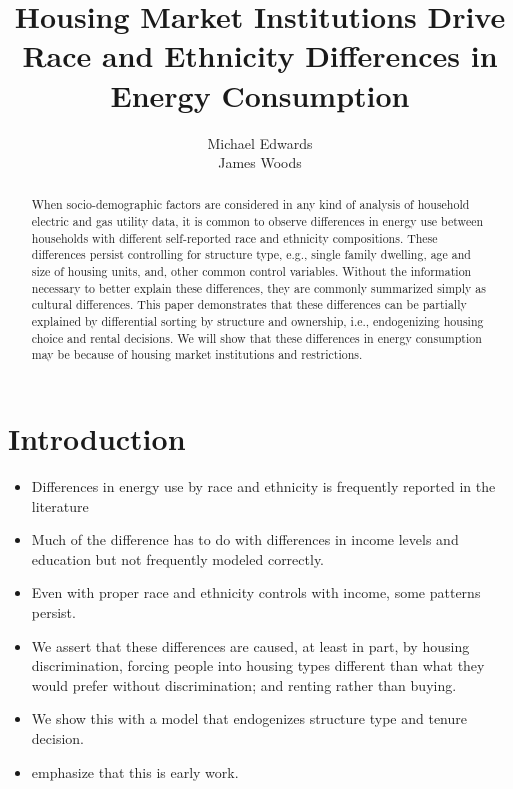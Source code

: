 \documentclass{article}
\author{Michael Edwards\\ 
  James Woods}
\title{Housing Market Institutions Drive Race and Ethnicity Differences in Energy Consumption}
\begin{document}
\maketitle


\begin{abstract}

When socio-demographic factors are considered in any kind of analysis of household electric and gas utility data, it is common to observe differences in energy use between households with different self-reported race and ethnicity compositions. These differences persist controlling for structure type, e.g., single family dwelling, age and size of housing units, and, other common control variables. Without the information necessary to better explain these differences, they are commonly summarized simply as cultural differences. This paper demonstrates that these differences can be partially explained by differential sorting by structure and ownership, i.e., endogenizing housing choice and rental decisions. We will show that these differences in energy consumption may be because of housing market institutions and restrictions.
\end{abstract}

\section{Introduction}


\begin{itemize}

  \item Differences in energy use by race and ethnicity is frequently reported in the literature
  \item Much of the difference has to do with differences in income levels and education but not frequently modeled correctly.
  \item Even with proper race and ethnicity controls with income, some patterns persist.
  \item We assert that these differences are caused, at least in part, by housing discrimination, forcing people into housing types different than what they would prefer without discrimination; and renting rather than buying.
  \item We show this with a model that endogenizes structure type and tenure decision.
  \item emphasize that this is early work.
\end{itemize}
\end{document}
